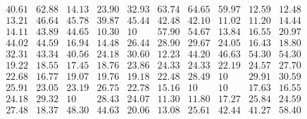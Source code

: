 \documentclass[12pt,oneside,a4paper]{article}
\begin{document}
\begin{equation}
  \tag{Mean Tabu Duration for each city (alpha = 5 and 100 cities)}
  \begin{smallmatrix} 40.61 & 62.88 & 14.13 & 23.90 & 32.93 & 63.74 & 64.65 & 59.97 & 12.59 & 12.48 \\
    13.21 & 46.64 & 45.78 & 39.87 & 45.44 & 42.48 & 42.10 & 11.02 & 11.20 & 14.44 \\
    14.11 & 43.89 & 44.65 & 10.30 & 10 & 57.90 & 54.67 & 13.84 & 16.55 & 20.97 \\
    44.02 & 44.59 & 16.94 & 14.48 & 26.44 & 28.90 & 29.67 & 24.05 & 16.43 & 18.80 \\
    32.31 & 43.34 & 40.56 & 24.18 & 30.60 & 12.23 & 44.20 & 46.63 & 54.30 & 54.30 \\
    19.22 & 18.55 & 17.45 & 18.76 & 23.86 & 24.33 & 24.33 & 22.19 & 24.57 & 27.70 \\
    22.68 & 16.77 & 19.07 & 19.76 & 19.18 & 22.48 & 28.49 & 10 & 29.91 & 30.59 \\
    25.91 & 23.05 & 23.19 & 26.75 & 22.78 & 15.16 & 10 & 10 & 17.63 & 16.55 \\
    24.18 & 29.32 & 10 & 28.43 & 24.07 & 11.30 & 11.80 & 17.27 & 25.84 & 24.59 \\
    27.48 & 18.37 & 48.30 & 44.63 & 20.06 & 13.08 & 25.61 & 42.44 & 41.27 & 58.40 
  \end{smallmatrix}
\end{equation}

\begin{table}[h]
  \caption{Average of the results for the four runs with FTD1}
\end{table}
\end{document}
